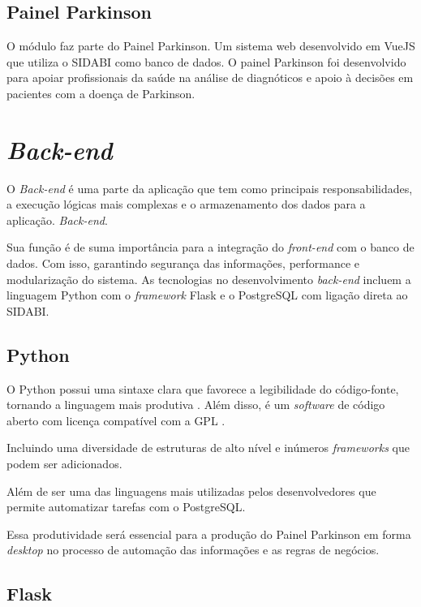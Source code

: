 \subsection{Painel Parkinson}
\label{sec:PAINEL}

O módulo faz parte do Painel Parkinson. Um sistema web desenvolvido em VueJS que utiliza o SIDABI como banco de dados. O painel Parkinson foi desenvolvido para apoiar profissionais da saúde na análise de diagnóticos e apoio à decisões em pacientes  com a doença de Parkinson.

\section{\textit{Back-end}}
\label{sec:Back end}

O \textit{Back-end} é uma parte da aplicação que tem como principais responsabilidades, a execução lógicas mais complexas e o armazenamento dos dados para a aplicação.
\textit{Back-end}\cite{alura_backend}.

Sua função é de suma importância para a integração do \textit{front-end} com o banco de dados. Com isso, garantindo segurança das informações, performance e modularização do sistema.
As tecnologias no desenvolvimento \textit{back-end} incluem a linguagem Python com o \textit{framework} Flask e o PostgreSQL com ligação direta ao SIDABI.

\subsection{Python}
\label{sec:Python}
O Python possui uma sintaxe clara que favorece a legibilidade do código-fonte, tornando a linguagem mais produtiva \cite{borges2014python}. Além disso, é um \textit{software} de código aberto com licença compatível com a GPL \cite{borges2014python}.

Incluindo uma diversidade de estruturas de alto nível e inúmeros \textit{frameworks} que podem ser adicionados.

Além de ser uma das linguagens mais utilizadas pelos desenvolvedores que permite automatizar tarefas com o PostgreSQL.

Essa produtividade será essencial para a produção do Painel Parkinson em forma \textit{desktop} no processo de automação das informações e as regras de negócios.

\subsection{Flask}
\label{sec:Flask}

